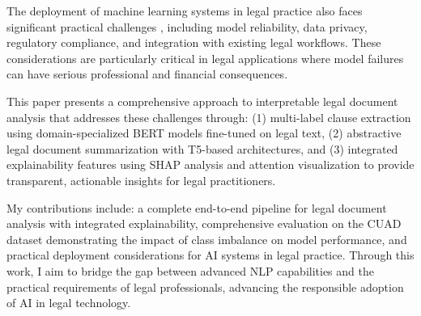 The deployment of machine learning systems in legal practice also faces significant practical challenges \cite{paleyes2022challenges}, including model reliability, data privacy, regulatory compliance, and integration with existing legal workflows. These considerations are particularly critical in legal applications where model failures can have serious professional and financial consequences.

This paper presents a comprehensive approach to interpretable legal document analysis that addresses these challenges through: (1) multi-label clause extraction using domain-specialized BERT models fine-tuned on legal text, (2) abstractive legal document summarization with T5-based architectures, and (3) integrated explainability features using SHAP analysis and attention visualization to provide transparent, actionable insights for legal practitioners.

My contributions include: a complete end-to-end pipeline for legal document analysis with integrated explainability, comprehensive evaluation on the CUAD dataset demonstrating the impact of class imbalance on model performance, and practical deployment considerations for AI systems in legal practice. Through this work, I aim to bridge the gap between advanced NLP capabilities and the practical requirements of legal professionals, advancing the responsible adoption of AI in legal technology.

